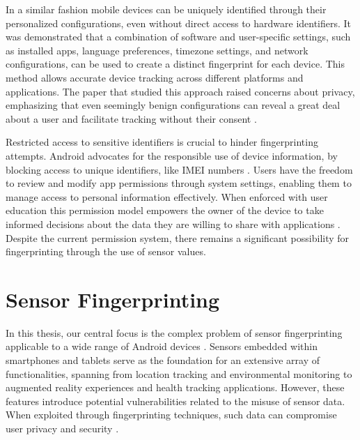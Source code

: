 \documentclass[11pt,
  oneside,openany,    %
]{scrreprt}
\begin{document}
In a similar fashion mobile devices can be uniquely identified through their personalized configurations, even without direct access to hardware identifiers.
It was demonstrated that a combination of software and user-specific settings, such as installed apps, language preferences, timezone settings, and network configurations, can be used to create a distinct fingerprint for each device.
This method allows accurate device tracking across different platforms and applications.
The paper that studied this approach raised concerns about privacy, emphasizing that even seemingly benign configurations can reveal a great deal about a user and facilitate tracking without their consent \cite{DBLP:journals/popets/KurtzGBRF16}.

Restricted access to sensitive identifiers is crucial to hinder fingerprinting attempts. 
Android advocates for the responsible use of device information, by blocking access to unique identifiers, like IMEI numbers \cite{android_privacy_10, DBLP:conf/ndss/MengZXZZBLTD23}.
Users have the freedom to review and modify app permissions through system settings, enabling them to manage access to personal information effectively. 
When enforced with user education this permission model empowers the owner of the device to take informed decisions about the data they are willing to share with applications \cite{DBLP:conf/icta/NegashS15}.
Despite the current permission system, there remains a significant possibility for fingerprinting through the use of sensor values.

\chapter{Sensor Fingerprinting}
\label{chap:sensor_fingerprint}
In this thesis, our central focus is the complex problem of sensor fingerprinting applicable to a wide range of Android devices \cite{DBLP:journals/comsur/BaldiniS17}. 
Sensors embedded within smartphones and tablets serve as the foundation for an extensive array of functionalities, spanning from location tracking and environmental monitoring to augmented reality experiences and health tracking applications. 
However, these features introduce potential vulnerabilities related to the misuse of sensor data.
When exploited through fingerprinting techniques, such data can compromise user privacy and security \cite{DBLP:conf/ndss/MengZXZZBLTD23}.
\end{document}
